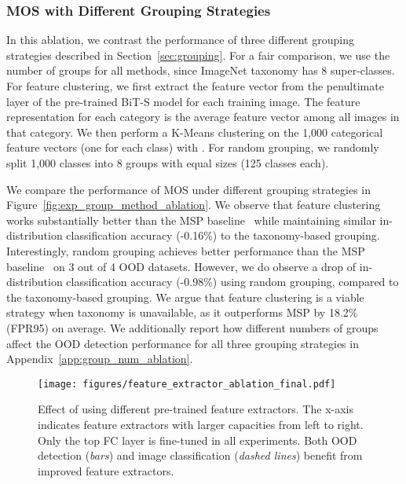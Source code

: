 \documentclass[final]{cvpr}
\begin{document}
\subsubsection{MOS with Different Grouping Strategies}
\vspace{-0.2cm}
\label{sec:grouping_method_ablation}
In this ablation, we contrast the performance of three different grouping strategies described in Section~\ref{sec:grouping}. For a fair comparison, we use the number of groups  for all methods, since ImageNet taxonomy has 8 super-classes.
For feature clustering, we first extract the feature vector from the penultimate layer of the pre-trained BiT-S model for each training image. The feature representation for each category is the average feature vector among all images in that category. We then perform a K-Means clustering on the 1,000 categorical feature vectors (one for each class) with . For random grouping, we randomly split 1,000 classes into 8 groups with equal sizes (125 classes each). 

We compare the performance of MOS under different grouping strategies in Figure~\ref{fig:exp_group_method_ablation}. We observe that feature clustering works substantially better than the MSP baseline~\cite{hendrycks2016baseline} while maintaining similar in-distribution classification accuracy (-0.16\%) to the taxonomy-based grouping. Interestingly, random grouping achieves better performance than the MSP baseline~\cite{hendrycks2016baseline} on 3 out of 4 OOD datasets. However, we do observe a drop of in-distribution classification accuracy (-0.98\%) using random grouping, compared to the taxonomy-based grouping. We argue that feature clustering is a viable strategy when taxonomy is unavailable, as it outperforms MSP by 18.2\% (FPR95) on average. We additionally report how different numbers of groups  affect the OOD detection performance for all three grouping strategies in Appendix~\ref{app:group_num_ablation}. 


\begin{figure*}[t]
    \centering
        \vspace{-0.2cm}
    \texttt{[image: figures/feature\_extractor\_ablation\_final.pdf]}
    \caption{\small{Effect of using different pre-trained feature extractors. The x-axis indicates feature extractors with larger capacities from left to right. Only the top FC layer is fine-tuned in all experiments. Both OOD detection (\textit{bars}) and image classification (\textit{dashed lines}) benefit from improved feature extractors.}}
    \vspace{-0.2cm}
    \label{fig:exp_feature_extractor_ablation}
\end{figure*}
\end{document}
